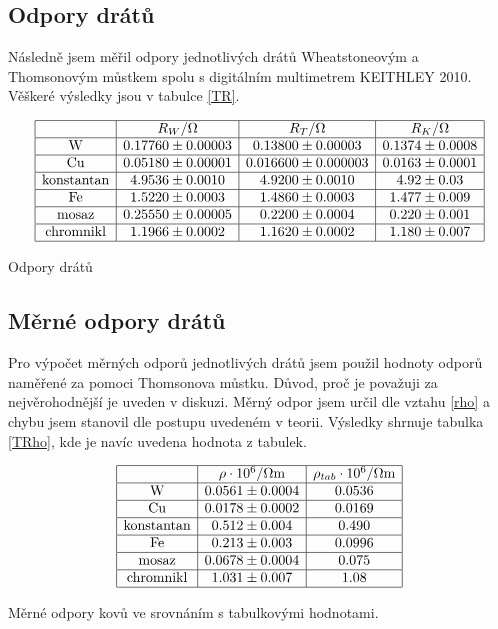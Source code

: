 \documentclass[a4paper,12pt]{article}
\begin{document}
\subsection{Odpory drátů}
Následně jsem měřil odpory jednotlivých drátů Wheatstoneovým a Thomsonovým můstkem spolu s digitálním multimetrem KEITHLEY 2010. Věškeré výsledky jsou v tabulce \ref{TR}.

\begin{table}
$$
\begin{array}{|c|c|c|c|}
\hline
&   R_W/\Omega& R_T/\Omega& R_K/\Omega \\ \hline
\mbox{W}&   0.17760\pm 0.00003& 0.13800\pm 0.00003  &   0.1374\pm0.0008 \\ \hline
\mbox{Cu}&  0.05180\pm 0.00001& 0.016600\pm 0.000003&   0.0163\pm 0.0001 \\ \hline
\mbox{konstantan}&  4.9536 \pm 0.0010  & 4.9200\pm 0.0010   & 4.92\pm 0.03   \\ \hline
\mbox{Fe}& 1.5220\pm 0.0003 & 1.4860\pm 0.0003& 1.477\pm0.009 \\ \hline
\mbox{mosaz}&  0.25550 \pm 0.00005 & 0.2200\pm 0.0004& 0.220\pm0.001 \\ \hline
\mbox{chromnikl}&   1.1966 \pm 0.0002&  1.1620\pm 0.0002 &  1.180\pm0.007 \\ \hline
\end{array}
$$
\caption{Odpory drátů}
\label{TR}
\end{table}

\subsection{Měrné odpory drátů}
Pro výpočet měrných odporů jednotlivých drátů jsem použil hodnoty odporů naměřené za pomoci Thomsonova můstku. Důvod, proč je považuji za nejvěrohodnější je uveden v diskuzi. 
Měrný odpor jsem určil dle vztahu \ref{rho} a chybu jsem stanovil dle postupu uvedeném v teorii. Výsledky shrnuje tabulka \ref{TRho}, kde je navíc uvedena hodnota z tabulek.

\begin{table}
$$
\begin{array}{|c|c|c|}
\hline
&   \rho\cdot 10^6/\Omega\mbox{m}&\rho_{tab}\cdot 10^6/\Omega\mbox{m} \\ \hline
\mbox{W}&   0.0561\pm 0.0004&   0.0536 \\ \hline
\mbox{Cu}& 0.0178\pm 0.0002&    0.0169 \\ \hline
\mbox{konstantan}&  0.512\pm 0.004& 0.490 \\ \hline
\mbox{Fe}&  0.213\pm 0.003& 0.0996 \\ \hline
\mbox{mosaz}&   0.0678\pm 0.0004&   0.075 \\ \hline
\mbox{chromnikl}&  1.031\pm 0.007 & 1.08 \\ \hline
\end{array}
$$
\caption{Měrné odpory kovů ve srovnáním s tabulkovými hodnotami.}
\label{TRho}
\end{table}
\end{document}
